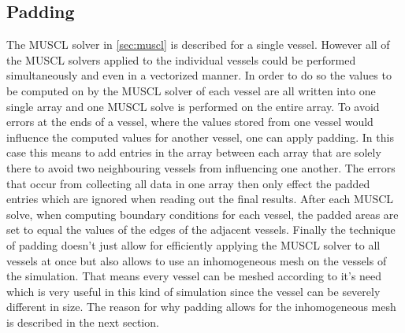\documentclass[a4paper, oneside]{discothesis}
\begin{document}
							\subsection{Padding} \label{sec:pdd}
							The MUSCL solver in \autoref{sec:muscl} is described for a single vessel.
							However all of the MUSCL solvers applied to the individual vessels could be performed simultaneously and even in a vectorized manner.
							In order to do so the values to be computed on by the MUSCL solver of each vessel are all written into one single array and one MUSCL solve is performed on the entire array.
							To avoid errors at the ends of a vessel, where the values stored from one vessel would influence the computed values for another vessel, one can apply padding.
							In this case this means to add entries in the array between each array that are solely there to avoid two neighbouring vessels from influencing one another.
							The errors that occur from collecting all data in one array then only effect the padded entries which are ignored when reading out the final results.
							After each MUSCL solve, when computing boundary conditions for each vessel, the padded areas are set to equal the values of the edges of the adjacent vessels.
							Finally the technique of padding doesn't just allow for efficiently applying the MUSCL solver to all vessels at once but also allows to use an inhomogeneous mesh on the vessels of the simulation.
							That means every vessel can be meshed according to it's need which is very useful in this kind of simulation since the vessel can be severely different in size.
							The reason for why padding allows for the inhomogeneous mesh is described in the next section.
\end{document}

